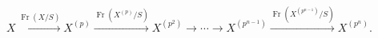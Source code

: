 \(\displaystyle
X \xrightarrow{\operatorname{Fr}(X/S)} X^{(p)}
  \xrightarrow{\operatorname{Fr}(X^{(p)}/S)} X^{(p^2)}
  \longrightarrow \cdots \longrightarrow X^{(p^{n-1})}
  \xrightarrow{\operatorname{Fr}(X^{(p^{n-1})}/S)} X^{(p^n)} .
\)
